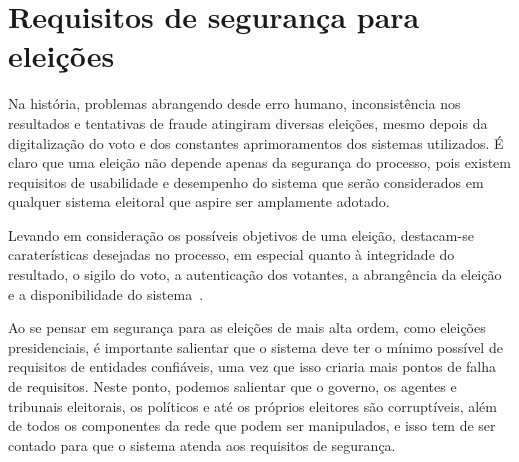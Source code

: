 \section{Requisitos de segurança para eleições}

Na história, problemas abrangendo desde erro humano, inconsistência nos resultados e tentativas de fraude atingiram diversas eleições, mesmo depois da digitalização do voto e dos constantes aprimoramentos dos sistemas utilizados. É claro que uma eleição não depende apenas da segurança do processo, pois existem requisitos de usabilidade e desempenho do sistema que serão considerados em qualquer sistema eleitoral que aspire ser amplamente adotado.

Levando em consideração os possíveis objetivos de uma eleição, destacam-se caraterísticas desejadas no processo, em especial quanto à integridade do resultado, o sigilo do voto, a autenticação dos votantes, a abrangência da eleição e a disponibilidade do sistema~\cite{jones2012broken}.

Ao se pensar em segurança para as eleições de mais alta ordem, como eleições presidenciais, é importante salientar que o sistema deve ter o mínimo possível de requisitos de entidades confiáveis, uma vez que isso criaria mais pontos de falha de requisitos. Neste ponto, podemos salientar que o governo, os agentes e tribunais eleitorais, os políticos e até os próprios eleitores são corruptíveis, além de todos os componentes da rede que podem ser manipulados, e isso tem de ser contado para que o sistema atenda aos requisitos de segurança.





